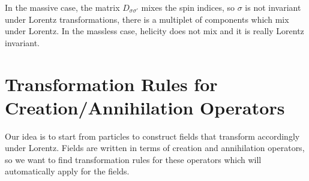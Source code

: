 \documentclass[../main.tex]{subfiles}
\begin{document}
In the massive case, the matrix $D_{\sigma\sigma'}$ mixes the spin indices, so $\sigma$ is not invariant under Lorentz transformations, there is a multiplet of components which mix under Lorentz. In the massless case, helicity does not mix and it is really Lorentz invariant.
\section{Transformation Rules for Creation/Annihilation Operators}
Our idea is to start from particles to construct fields that transform accordingly under Lorentz. Fields are written in terms of creation and annihilation operators, so we want to find transformation rules for these operators which will automatically apply for the fields.\\
\end{document}
